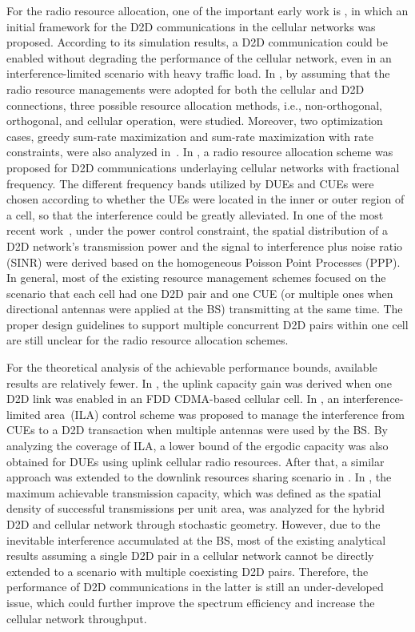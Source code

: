\documentclass[journal, 10pt]{IEEEtran}
\begin{document}
For the radio resource allocation, one of the important early work is
\cite{Janis:09OtherJ}, in which an initial framework for the D2D
communications in the cellular networks was proposed. According to its
simulation results, a D2D communication could be enabled without
degrading the performance of the cellular network, even in an
interference-limited scenario with heavy traffic load. In
\cite{Yu:11TWC}, by assuming that the radio resource managements were
adopted for both the cellular and D2D connections, three possible
resource allocation methods, i.e., non-orthogonal, orthogonal, and
cellular operation, were studied. Moreover, two optimization cases,
greedy sum-rate maximization and sum-rate maximization with rate
constraints, were also analyzed in~\cite{Yu:11TWC}. In
\cite{Chae:11APCC}, a radio resource allocation scheme was proposed
for D2D communications underlaying cellular networks with fractional
frequency. The different frequency bands utilized by DUEs and CUEs
were chosen according to whether the UEs were located in the inner or
outer region of a cell, so that the interference could be greatly
alleviated. In one of the most recent work~\cite{Erturk:2013LC}, under
the power control constraint, the spatial distribution of a D2D
network's transmission power and the signal to interference plus noise
ratio (SINR) were derived based on the homogeneous Poisson Point
Processes (PPP). In general, most of the existing resource management
schemes focused on the scenario that each cell had one D2D pair and
one CUE (or multiple ones when directional antennas were applied at
the BS) transmitting at the same time. The proper design guidelines to
support multiple concurrent D2D pairs within one cell are still
unclear for the radio resource allocation schemes.



For the theoretical analysis of the achievable performance bounds,
available results are relatively fewer. In \cite{Cheng:11OtherC}, the
uplink capacity gain was derived when one D2D link was enabled in an
FDD CDMA-based cellular cell. In \cite{Min:11TWC-b}, an
interference-limited area~(ILA) control scheme was proposed to manage
the interference from CUEs to a D2D transaction when multiple antennas
were used by the BS. By analyzing the coverage of ILA, a lower bound
of the ergodic capacity was also obtained for DUEs using uplink
cellular radio resources. After that, a similar approach was extended
to the downlink resources sharing scenario in \cite{Chen:12OtherC}. In
\cite{Liu:12CrownCom}, the maximum achievable transmission capacity,
which was defined as the spatial density of successful transmissions
per unit area, was analyzed for the hybrid D2D and cellular network
through stochastic geometry. However, due to the inevitable
interference accumulated at the BS, most of the existing analytical
results assuming a single D2D pair in a cellular network cannot be
directly extended to a scenario with multiple coexisting D2D pairs.
Therefore, the performance of D2D communications in the latter is
still an under-developed issue, which could further improve the
spectrum efficiency and increase the cellular network throughput.
\end{document}
